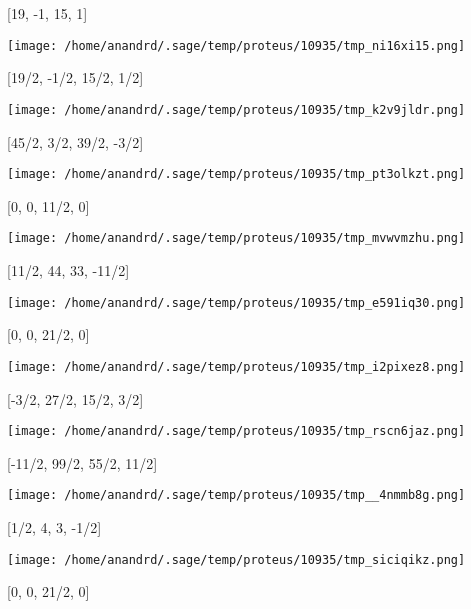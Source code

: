 \documentclass[11pt]{article}
\begin{document}
[19, -1, 15, 1]
\begin{center}
\texttt{[image: /home/anandrd/.sage/temp/proteus/10935/tmp\_ni16xi15.png]}
\end{center}
[19/2, -1/2, 15/2, 1/2]
\begin{center}
\texttt{[image: /home/anandrd/.sage/temp/proteus/10935/tmp\_k2v9jldr.png]}
\end{center}
[45/2, 3/2, 39/2, -3/2]
\begin{center}
\texttt{[image: /home/anandrd/.sage/temp/proteus/10935/tmp\_pt3olkzt.png]}
\end{center}
[0, 0, 11/2, 0]
\begin{center}
\texttt{[image: /home/anandrd/.sage/temp/proteus/10935/tmp\_mvwvmzhu.png]}
\end{center}
[11/2, 44, 33, -11/2]
\begin{center}
\texttt{[image: /home/anandrd/.sage/temp/proteus/10935/tmp\_e591iq30.png]}
\end{center}
[0, 0, 21/2, 0]
\begin{center}
\texttt{[image: /home/anandrd/.sage/temp/proteus/10935/tmp\_i2pixez8.png]}
\end{center}
[-3/2, 27/2, 15/2, 3/2]
\begin{center}
\texttt{[image: /home/anandrd/.sage/temp/proteus/10935/tmp\_rscn6jaz.png]}
\end{center}
[-11/2, 99/2, 55/2, 11/2]
\begin{center}
\texttt{[image: /home/anandrd/.sage/temp/proteus/10935/tmp\_\_4nmmb8g.png]}
\end{center}
[1/2, 4, 3, -1/2]
\begin{center}
\texttt{[image: /home/anandrd/.sage/temp/proteus/10935/tmp\_siciqikz.png]}
\end{center}
[0, 0, 21/2, 0]
\end{document}
